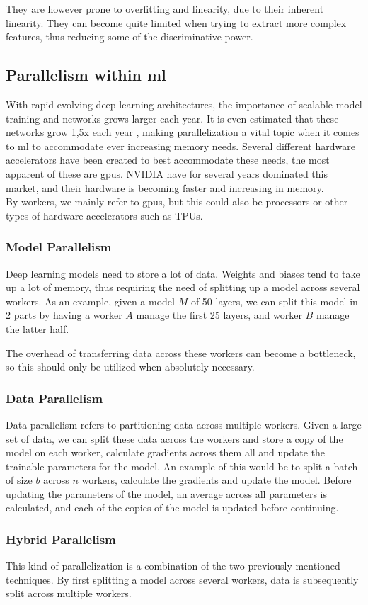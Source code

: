 They are however prone to overfitting and linearity, due to their inherent linearity. They can become quite limited when trying to extract more complex features, thus reducing some of the discriminative power.

\subsection{Parallelism within \acrlong{ml}}

With rapid evolving deep learning architectures, the importance of scalable model training and networks grows larger each year. It is even estimated that these networks grow 1,5x each year \cite{9499913}, making parallelization a vital topic when it comes to \acrlong{ml} to accommodate ever increasing memory needs. Several different hardware accelerators have been created to best accommodate these needs, the most apparent of these are \acrshort{gpu}s. NVIDIA have for several years dominated this market, and their hardware is becoming faster and increasing in memory. \\

By workers, we mainly refer to \acrshort{gpu}s, but this could also be processors or other types of hardware accelerators such as TPUs.


\subsubsection{Model Parallelism}

Deep learning models need to store a lot of data. Weights and biases tend to take up a lot of memory, thus requiring the need of splitting up a model across several workers. As an example, given a model $M$ of 50 layers, we can split this model in 2 parts by having a worker $A$ manage the first 25 layers, and worker $B$ manage the latter half.

The overhead of transferring data across these workers can become a bottleneck, so this should only be utilized when absolutely necessary.

\subsubsection{Data Parallelism}

Data parallelism refers to partitioning data across multiple workers.  Given a large set of data, we can split these data across the workers and store a copy of the model on each worker, calculate gradients across them all and update the trainable parameters for the model. An example of this would be to split a batch of size $b$ across $n$ workers, calculate the gradients and update the model. Before updating the parameters of the model, an average across all parameters is calculated, and each of the copies of the model is updated before continuing.

\subsubsection{Hybrid Parallelism}

This kind of parallelization is a combination of the two previously mentioned techniques. By first splitting a model across several workers, data is subsequently split across multiple workers. 

